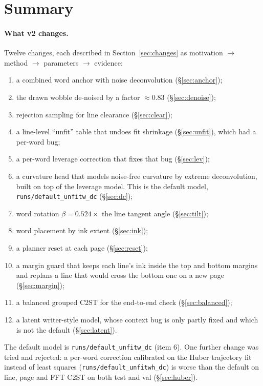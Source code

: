 \documentclass[11pt,a4paper]{article}
\begin{document}
\tableofcontents
\newpage

\section{Summary}

\paragraph{What v2 changes.} Twelve changes, each described in
Section~\ref{sec:changes} as motivation $\rightarrow$ method $\rightarrow$
parameters $\rightarrow$ evidence:
\begin{enumerate}
\item a combined word anchor with noise deconvolution (\S\ref{sec:anchor});
\item the drawn wobble de-noised by a factor $\approx0.83$ (\S\ref{sec:denoise});
\item rejection sampling for line clearance (\S\ref{sec:clear});
\item a line-level ``unfit'' table that undoes fit shrinkage (\S\ref{sec:unfit}), which had a per-word bug;
\item a per-word leverage correction that fixes that bug (\S\ref{sec:lev});
\item a curvature head that models noise-free curvature by extreme
  deconvolution, built on top of the leverage model. This is the default
  model, \texttt{runs/default\_unfitw\_dc} (\S\ref{sec:dc});
\item word rotation $\beta=0.524\times$ the line tangent angle (\S\ref{sec:tilt});
\item word placement by ink extent (\S\ref{sec:ink});
\item a planner reset at each page (\S\ref{sec:reset});
\item a margin guard that keeps each line's ink inside the top and bottom
  margins and replans a line that would cross the bottom one on a new page
  (\S\ref{sec:margin});
\item a balanced grouped C2ST for the end-to-end check (\S\ref{sec:balanced});
\item a latent writer-style model, whose context bug is only partly fixed and which is not the default (\S\ref{sec:latent}).
\end{enumerate}
The default model is \texttt{runs/default\_unfitw\_dc} (item 6). One further
change was tried and rejected: a per-word correction calibrated on the Huber
trajectory fit instead of least squares (\texttt{runs/default\_unfitwh\_dc})
is worse than the default on line, page and FFT C2ST on both test and val
(\S\ref{sec:huber}).
\end{document}
